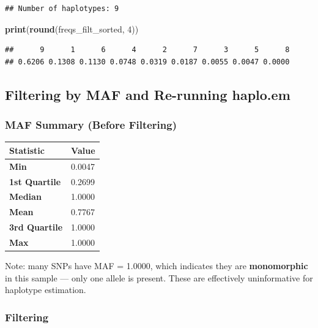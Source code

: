 \documentclass[
]{article}
\newenvironment{Shaded}{\begin{snugshade}}{\end{snugshade}}
\newcommand{\DecValTok}[1]{\textcolor[rgb]{0.00,0.00,0.81}{#1}}
\newcommand{\FunctionTok}[1]{\textcolor[rgb]{0.13,0.29,0.53}{\textbf{#1}}}
\newcommand{\NormalTok}[1]{#1}
\newcounter{none} %
\begin{document}
\begin{verbatim}
## Number of haplotypes: 9
\end{verbatim}

\begin{Shaded}
\begin{Highlighting}[]
\FunctionTok{print}\NormalTok{(}\FunctionTok{round}\NormalTok{(freqs\_filt\_sorted, }\DecValTok{4}\NormalTok{))}
\end{Highlighting}
\end{Shaded}

\begin{verbatim}
##      9      1      6      4      2      7      3      5      8 
## 0.6206 0.1308 0.1130 0.0748 0.0319 0.0187 0.0055 0.0047 0.0000
\end{verbatim}

\subsection{Filtering by MAF and Re-running
haplo.em}\label{filtering-by-maf-and-re-running-haplo.em}

\subsubsection{MAF Summary (Before
Filtering)}\label{maf-summary-before-filtering}

{\def\LTcaptype{none} %
\begin{longtable}[]{@{}ll@{}}
\toprule\noalign{}
Statistic & Value \\
\midrule\noalign{}
\endhead
\bottomrule\noalign{}
\endlastfoot
\textbf{Min} & 0.0047 \\
\textbf{1st Quartile} & 0.2699 \\
\textbf{Median} & 1.0000 \\
\textbf{Mean} & 0.7767 \\
\textbf{3rd Quartile} & 1.0000 \\
\textbf{Max} & 1.0000 \\
\end{longtable}
}

Note: many SNPs have MAF = 1.0000, which indicates they are
\textbf{monomorphic} in this sample --- only one allele is present.
These are effectively uninformative for haplotype estimation.

\subsubsection{Filtering}\label{filtering-1}
\end{document}
